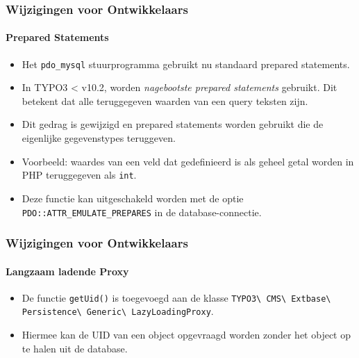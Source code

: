 \begin{frame}[fragile]
	\frametitle{Wijzigingen voor Ontwikkelaars}
	\framesubtitle{Prepared Statements}

	\lstset{basicstyle=\tiny\ttfamily}

	\begin{itemize}
		\item Het \texttt{pdo\_mysql} stuurprogramma gebruikt nu standaard prepared statements.
		\item In TYPO3 < v10.2, worden \textit{nagebootste prepared statements} gebruikt.
			Dit betekent dat alle teruggegeven waarden van een query teksten zijn.
		\item Dit gedrag is gewijzigd en prepared statements worden gebruikt
			die de eigenlijke gegevenstypes teruggeven.
		\item Voorbeeld: waardes van een veld dat gedefinieerd is als geheel getal worden in PHP
			teruggegeven als \texttt{int}.
		\item Deze functie kan uitgeschakeld worden met de optie
			\texttt{PDO::ATTR\_EMULATE\_PREPARES} in de database-connectie.

	\end{itemize}

\end{frame}


\begin{frame}[fragile]
	\frametitle{Wijzigingen voor Ontwikkelaars}
	\framesubtitle{Langzaam ladende Proxy}

	\lstset{basicstyle=\tiny\ttfamily}

	\begin{itemize}
		\item De functie \texttt{getUid()} is toegevoegd aan de klasse\newline
			\texttt{TYPO3\textbackslash
				CMS\textbackslash
				Extbase\textbackslash
				Persistence\textbackslash
				Generic\textbackslash
				LazyLoadingProxy}.
		\item Hiermee kan de UID van een object opgevraagd worden zonder het object op te halen uit de database.

	\end{itemize}

\end{frame}

